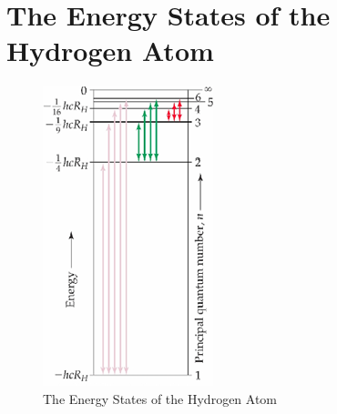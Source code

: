 \documentclass[
	chapter=7,
	title={Quantum Theory {\&} the Electronic Structure of Atoms},
	showanswers=true,
]{chem122notes}
\begin{document}
\section{The Energy States of the Hydrogen Atom}\label{sec:the-energy-states-of-the-hydrogen-atom}
\begin{minipage}[m]{0.45\textwidth}
	\begin{figure}[H]
		\centering
		\includegraphics[width=\textwidth]{chapter7/image16}
		\caption{The Energy States of the Hydrogen Atom}
		\label{fig:hydrogen-atom-energy-states}
	\end{figure}
\end{minipage}\hfill%
\end{document}
